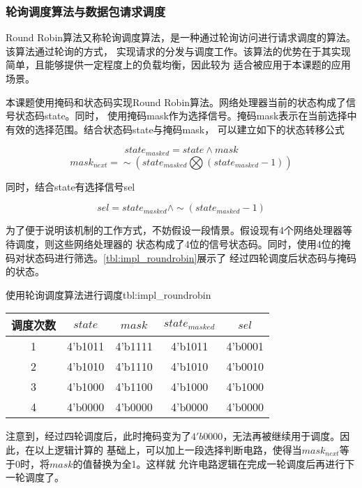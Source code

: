 \subsubsection{轮询调度算法与数据包请求调度}

Round Robin算法又称轮询调度算法，是一种通过轮询访问进行请求调度的算法。该算法通过轮询的方式，
实现请求的分发与调度工作。该算法的优势在于其实现简单，且能够提供一定程度上的负载均衡，因此较为
适合被应用于本课题的应用场景。

本课题使用掩码和状态码实现Round Robin算法。网络处理器当前的状态构成了信号状态码state。同时，
使用掩码mask作为选择信号。掩码mask表示在当前选择中有效的选择范围。结合状态码state与掩码mask，
可以建立如下的状态转移公式

\begin{equation}
state_{masked} = state \land mask
\end{equation}
\begin{equation}
mask_{next} = \sim (state_{masked} \bigotimes (state_{masked} - 1))
\end{equation}

同时，结合state有选择信号sel

\begin{equation}
sel = state_{masked} \land \sim (state_{masked}-1)
\end{equation}

为了便于说明该机制的工作方式，不妨假设一段情景。假设现有4个网络处理器等待调度，则这些网络处理器的
状态构成了4位的信号状态码。同时，使用4位的掩码对状态码进行筛选。\autoref{tbl:impl_roundrobin}展示了
经过四轮调度后状态码与掩码的状态。

\begin{generaltab}{使用轮询调度算法进行调度}{tbl:impl_roundrobin}
  \begin{tabular}{c|cccc}
    \toprule
    调度次数 & $state$ & $mask$ & $state_{masked}$ & $sel$ \\
    \midrule
    1 & 4'b1011 & 4'b1111 & 4'b1011 & 4'b0001 \\
    2 & 4'b1010 & 4'b1110 & 4'b1010 & 4'b0010 \\
    3 & 4'b1000 & 4'b1100 & 4'b1000 & 4'b1000 \\
    4 & 4'b0000 & 4'b0000 & 4'b0000 & 4'b0000 \\
    \bottomrule
  \end{tabular}
\end{generaltab}

注意到，经过四轮调度后，此时掩码变为了$4'b0000$，无法再被继续用于调度。因此，在以上逻辑计算的
基础上，可以加上一段选择判断电路，使得当$mask_{next}$等于0时，将$mask$的值替换为全1。这样就
允许电路逻辑在完成一轮调度后再进行下一轮调度了。

